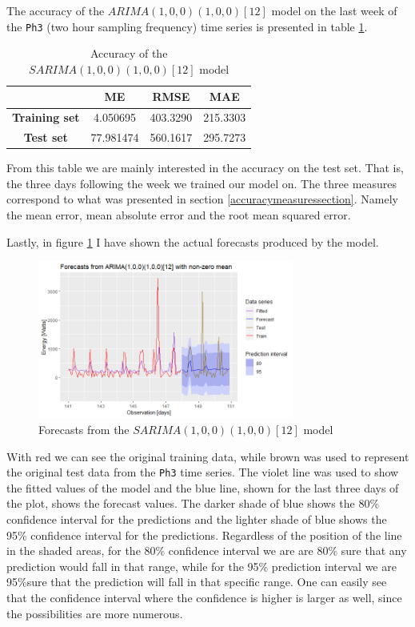\documentclass[12pt,a4paper,titlepage]{report}
\begin{document}
The accuracy of the $ ARIMA(1, 0, 0)(1, 0, 0)[12] $ model on the last week of the \texttt{Ph3} (two hour sampling frequency) time series is presented in table \ref{accuracyofinitialmodel}.

\begin{table}[h]
    \begin{tabular}{|c|c|c|c|}
        \hline
        & \textbf{ME} & \textbf{RMSE} & \textbf{MAE} \\
        \hline
        \textbf{Training set} & 4.050695 & 403.3290 & 215.3303\\
        \hline
        \textbf{Test set} & 77.981474 & 560.1617 & 295.7273 \\
        \hline
    \end{tabular}
    \centering
    \caption{Accuracy of the $ SARIMA(1, 0, 0)(1, 0, 0)[12] $ model}
    \label{accuracyofinitialmodel}
\end{table}

From this table we are mainly interested in the accuracy on the test set. That is, the three days following the week we trained our model on. The three measures correspond to what was presented in section \ref{accuracymeasuressection}. Namely the mean error, mean absolute error and the root mean squared error.

Lastly, in figure \ref{dlastweek2hrsph3forecasts} I have shown the actual forecasts produced by the model.

\begin{figure}[h]
    \centering
    \includegraphics[width=0.75\textwidth]{dlastweek2hrsph3forecasts}
    \caption{Forecasts from the $ SARIMA(1, 0, 0)(1, 0, 0)[12] $ model}
    \label{dlastweek2hrsph3forecasts}
\end{figure}

With red we can see the original training data, while brown was used to represent the original test data from the \texttt{Ph3} time series.
The violet line was used to show the fitted values of the model and the blue line, shown for the last three days of the plot, shows the forecast values. The darker shade of blue shows the 80\% confidence interval for the predictions and the lighter shade of blue shows the 95\% confidence interval for the predictions. Regardless of the position of the line in the shaded areas, for the 80\% confidence interval we are are 80\% sure that any prediction would fall in that range, while for the 95\% prediction interval we are 95\%sure that the prediction will fall in that specific range. One can easily see that the confidence interval where the confidence is higher is larger as well, since the possibilities are more numerous.
\end{document}
